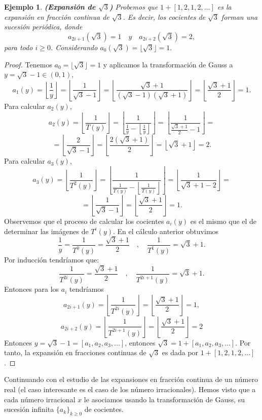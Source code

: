 \documentclass[12pt]{report}
\newtheorem{ejem}{Ejemplo}[section]
\begin{document}
\break

\begin{ejem}
\textbf{(Expansión de $\sqrt{3}$)} Probemos que $1+[1,2,1,2,\ldots]$ es la expansión en fracción continua de $\sqrt{3}$. Es decir, los cocientes de $\sqrt{3}$ forman una sucesión periódica, donde
$$
a_{2i+1}(\sqrt{3})=1 \quad y \quad a_{2i+2}(\sqrt{3})=2,
$$
para todo $i\geq0$.
Considerando $a_{0}(\sqrt{3})=\lfloor\sqrt{3}\rfloor=1.
$

\end{ejem}
\begin{proof}
Tenemos $a_{0}=\lfloor\sqrt{3}\rfloor=1$ y aplicamos la transformación de Gauss a $y = \sqrt{3}-1 \in (0,1)$,
$$
a_{1}(y)=\left\lfloor\frac{1}{y}\right\rfloor=\left\lfloor\frac{1}{\sqrt{3}-1}\right\rfloor=\left\lfloor\frac{\sqrt{3}+1}{(\sqrt{3}-1)(\sqrt{3}+1)}\right\rfloor=\left\lfloor\frac{\sqrt{3}+1}{2}\right\rfloor=1.
$$
Para calcular $a_{2}(y)$,
$$
a_{2}(y)=\left\lfloor\frac{1}{T(y)}\right\rfloor=\left\lfloor\frac{1}{\frac{1}{y}-\left\lfloor\frac{1}{y}\right\rfloor}\right\rfloor=\left\lfloor\frac{1}{\frac{\sqrt{3}+1}{2}-1}\right\rfloor=
$$
$$
=\left\lfloor\frac{2}{\sqrt{3}-1}\right\rfloor=\left\lfloor\frac{2(\sqrt{3}+1)}{2}\right\rfloor=\left\lfloor\sqrt{3}+1\right\rfloor=2.
$$
Para calcular $a_{3}(y)$,
$$
a_{3}(y)=\left\lfloor\frac{1}{T^{2}(y)}\right\rfloor=\left\lfloor\frac{1}{\frac{1}{T(y)}-\left\lfloor\frac{1}{T(y)}\right\rfloor}\right\rfloor=\left\lfloor\frac{1}{\sqrt{3}+1-2}\right\rfloor=
$$
$$
=\left\lfloor\frac{1}{\sqrt{3}-1}\right\rfloor=\left\lfloor\frac{\sqrt{3}+1}{2}\right\rfloor=1.
$$
Observemos que el proceso de calcular los cocientes $a_{i}(y)$ es el mismo que el de determinar las imágenes de $T^{i}(y)$. En el cálculo anterior obtuvimos
$$
\frac{1}{y}=\frac{1}{T^{0}(y)}=\frac{\sqrt{3}+1}{2}\quad,\quad \frac{1}{T^{1}(y)}=\sqrt{3}+1.
$$
Por inducción tendríamos que:
$$
\frac{1}{T^{2i}(y)}=\frac{\sqrt{3}+1}{2}\quad,\quad\frac{1}{T^{2i+1}(y)}=\sqrt{3}+1.
$$
Entonces para los $a_{i}$ tendríamos
$$
a_{2i+1}(y)=\left\lfloor\frac{1}{T^{2i}(y)}\right\rfloor = \left\lfloor\frac{\sqrt{3}+1}{2}\right\rfloor=1,
$$
$$
a_{2i+2}(y)=\left\lfloor\frac{1}{T^{2i+1}(y)}\right\rfloor = \left\lfloor\frac{\sqrt{3}+1}{2}\right\rfloor=2
$$
Entonces $y=\sqrt{3}-1=[a_{1},a_{2},a_{3},\ldots]$, entonces $\sqrt{3}=1+[a_{1},a_{2},a_{3},\ldots]$. Por tanto, la expansión en fracciones continuas de $\sqrt{3}$ es dada por $1+[1,2,1,2,\ldots]$.
\end{proof}

Continuando con el estudio de las expansiones en fracción continua de un número real (el caso interesante es el caso de los número irracionales). Hemos visto que a cada número irracional $x$ le asociamos usando la transformación de Gauss, su sucesión infinita $\{a_{k}\}_{k\geq0}$ de cocientes. 
\\
\end{document}
